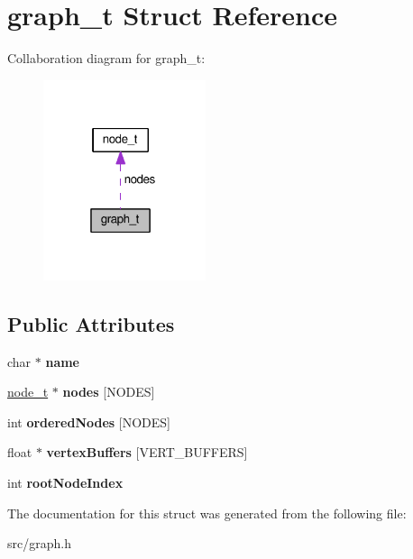 \hypertarget{structgraph__t}{}\section{graph\+\_\+t Struct Reference}
\label{structgraph__t}


Collaboration diagram for graph\+\_\+t\+:
\nopagebreak
\begin{figure}[H]
\begin{center}
\leavevmode
\includegraphics[width=135pt]{structgraph__t__coll__graph}
\end{center}
\end{figure}
\subsection*{Public Attributes}
\begin{DoxyCompactItemize}
\item 
\hypertarget{structgraph__t_aee43a7769717ef75bb2238786b143400}{}char $\ast$ {\bfseries name}\label{structgraph__t_aee43a7769717ef75bb2238786b143400}

\item 
\hypertarget{structgraph__t_ae9300e8c7dc08812cdca68e7d454d0e2}{}\hyperlink{structnode__t}{node\+\_\+t} $\ast$ {\bfseries nodes} \mbox{[}N\+O\+D\+E\+S\mbox{]}\label{structgraph__t_ae9300e8c7dc08812cdca68e7d454d0e2}

\item 
\hypertarget{structgraph__t_ab844005b39f6c8c08c3eab62615c0e10}{}int {\bfseries ordered\+Nodes} \mbox{[}N\+O\+D\+E\+S\mbox{]}\label{structgraph__t_ab844005b39f6c8c08c3eab62615c0e10}

\item 
\hypertarget{structgraph__t_ac5d6afdcf54a5e8ce1dda4f9d7125b8c}{}float $\ast$ {\bfseries vertex\+Buffers} \mbox{[}V\+E\+R\+T\+\_\+\+B\+U\+F\+F\+E\+R\+S\mbox{]}\label{structgraph__t_ac5d6afdcf54a5e8ce1dda4f9d7125b8c}

\item 
\hypertarget{structgraph__t_a34acafa6e94fb4875421cb413997d4df}{}int {\bfseries root\+Node\+Index}\label{structgraph__t_a34acafa6e94fb4875421cb413997d4df}

\end{DoxyCompactItemize}


The documentation for this struct was generated from the following file\+:\begin{DoxyCompactItemize}
\item 
src/graph.\+h\end{DoxyCompactItemize}
